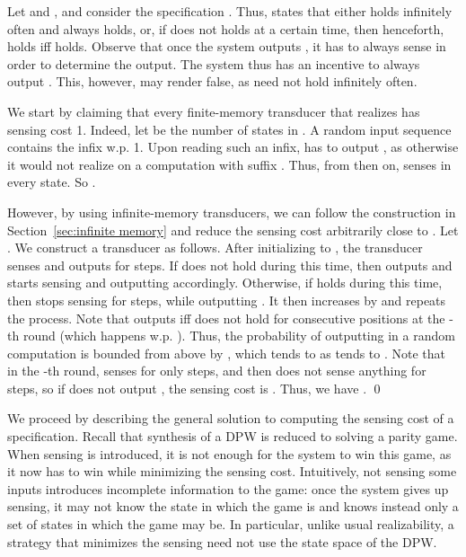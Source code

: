 \documentclass[runningheads,a4paper]{llncs}
\renewenvironment{example}{\begin{xmpl}\rm}{\end{xmpl}}
\newcommand{\DPW}{\mbox{\rm DPW}\xspace}
\begin{document}
\begin{example}
Let  and , and consider the specification . Thus,  states that either  holds infinitely often and  always holds, or, if  does not holds at a certain time, then henceforth,  holds iff  holds. Observe that once the system outputs , it has to always sense  in order to determine the output. 
The system thus has an incentive to always output . This, however, may render  false, as  need not hold infinitely often.

We start by claiming that every finite-memory transducer  that realizes  has sensing cost 1. Indeed, let  be the number of states in . A random input sequence contains the infix  w.p. 1. Upon reading such an infix,  has to output , as otherwise it would not realize  on a computation with suffix . Thus, from then on,  
senses
 in every state. So .

However, by using infinite-memory transducers, we can follow the construction in Section~\ref{sec:infinite memory} and reduce the sensing cost arbitrarily close to . Let . We construct a transducer  as follows. After initializing  to , the transducer  senses  and outputs  for  steps. If  does not hold during this time, then  outputs  and starts sensing  and outputting  accordingly. Otherwise, if  holds during this time, then  stops sensing  for  steps, while outputting . It then increases  by  and repeats the process. 
Note that  outputs  iff  does not hold for  consecutive positions at the -th round (which happens w.p. ). Thus, the probability of  outputting  in a random computation is bounded from above by , which tends to  as  tends to . Note that in the -th round,  senses  for only  steps, and then does not sense anything for  steps, so if  does not output , the sensing cost is . Thus, we have 
. \qed






\end{example}

We proceed by describing the general solution to computing the sensing cost of a specification.
Recall that synthesis of a DPW  is reduced to solving a parity game.
When sensing is introduced, it is not enough for the system to win this game, as it now has to win while minimizing the sensing cost. Intuitively, not sensing some inputs introduces incomplete information to the game: once the system gives up sensing, it may not know the state in which the game is and knows instead only a set of states in which the game may be. In particular, unlike usual realizability, a strategy that minimizes the sensing need not use the state space of the \DPW. 
\end{document}
